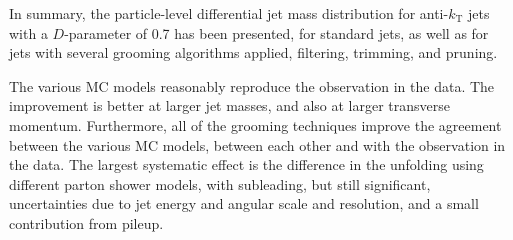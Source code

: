 \label{sec:summary}

In summary, the particle-level differential jet mass distribution for 
anti-$k_{\mathrm{T}}$ jets with a $D$-parameter of 0.7 has
been presented, for standard jets, as well as
for jets with several grooming algorithms applied,
filtering, trimming, and pruning. 

The various MC models reasonably reproduce the observation
in the data. The improvement is better at larger jet
masses, and also at larger transverse momentum. 
Furthermore, all of the grooming techniques improve
the agreement between the various MC models, between
each other and with the observation in the data. 
The largest systematic effect is the difference in the
unfolding using different parton shower models, with
subleading, but still significant, uncertainties due to
jet energy and angular scale and resolution, and
a small contribution from pileup. 


